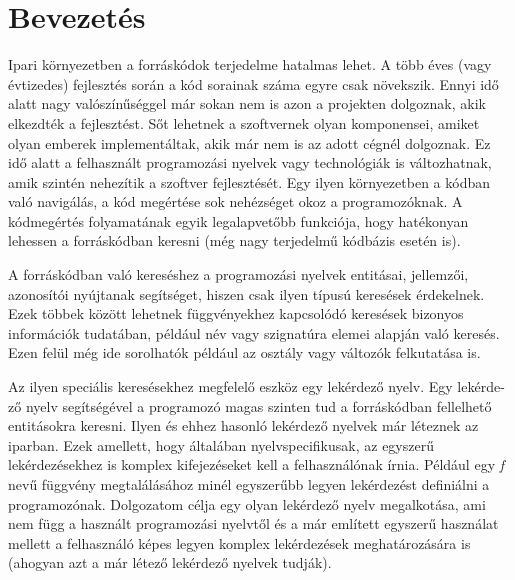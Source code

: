 \documentclass[a4paper,12pt]{report}
\begin{document}
\chapter{Bevezetés}
Ipari környezetben a forráskódok terjedelme hatalmas lehet. A több éves (vagy évtizedes) fejlesztés során a kód sorainak száma egyre csak növekszik. Ennyi idő alatt nagy valószínűséggel már sokan nem is azon a projekten dolgoznak, akik elkezdték a fejlesztést. Sőt lehetnek a szoftvernek olyan komponensei, amiket olyan emberek implementáltak, akik már nem is az adott cégnél dolgoznak. Ez idő alatt a felhasznált programozási nyelvek vagy technológiák is változhatnak, amik szintén nehezítik a szoftver fejlesztését. Egy ilyen környezetben a kódban való navigálás, a kód megértése sok nehézséget okoz a programozóknak. A kódmegértés folyamatának egyik legalapvetőbb funkciója, hogy hatékonyan lehessen a forráskódban keresni (még nagy terjedelmű kódbázis esetén is).
\par A forráskódban való kereséshez a programozási nyelvek entitásai, jellemzői, azonosítói nyújtanak segítséget, hiszen csak ilyen típusú keresések érdekelnek. Ezek többek között lehetnek függvényekhez kapcsolódó keresések bizonyos információk tudatában, például név vagy szignatúra elemei alapján való keresés. Ezen felül még ide sorolhatók például az osztály vagy változók felkutatása is. 
\par Az ilyen speciális keresésekhez megfelelő eszköz egy lekérdező nyelv. Egy lekérde-ző nyelv segítségével a programozó magas szinten tud a forráskódban fellelhető entitásokra keresni. Ilyen és ehhez hasonló lekérdező nyelvek már léteznek az iparban. Ezek amellett, hogy általában nyelvspecifikusak, az egyszerű lekérdezésekhez is komplex kifejezéseket kell a felhasználónak írnia. Például egy \textit{f} nevű függvény megtalálásához minél egyszerűbb legyen lekérdezést definiálni a programozónak. Dolgozatom célja egy olyan lekérdező nyelv megalkotása, ami nem függ a használt programozási nyelvtől és a már említett egyszerű használat mellett a felhasználó képes legyen komplex lekérdezések meghatározására is (ahogyan azt a már létező lekérdező nyelvek tudják).
\end{document}
